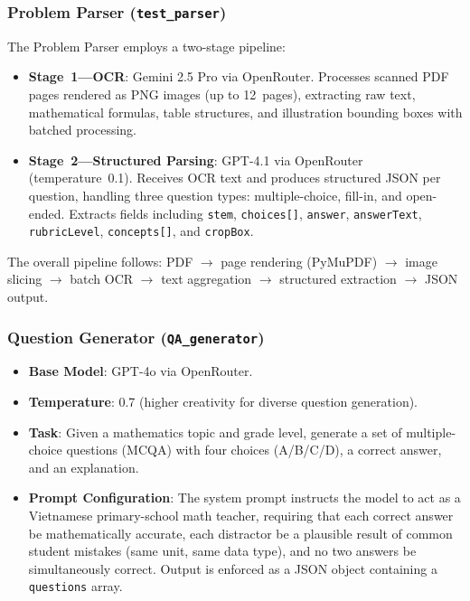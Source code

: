 \documentclass[12pt, a4paper]{article}
\begin{document}
\subsubsection{Problem Parser (\texttt{test\_parser})}
The Problem Parser employs a two-stage pipeline:
\begin{itemize}[nosep]
    \item \textbf{Stage~1---OCR}: Gemini 2.5 Pro via OpenRouter. Processes scanned PDF pages rendered as PNG images (up to 12~pages), extracting raw text, mathematical formulas, table structures, and illustration bounding boxes with batched processing.
    \item \textbf{Stage~2---Structured Parsing}: GPT-4.1 via OpenRouter (temperature~0.1). Receives OCR text and produces structured JSON per question, handling three question types: multiple-choice, fill-in, and open-ended. Extracts fields including \texttt{stem}, \texttt{choices[]}, \texttt{answer}, \texttt{answerText}, \texttt{rubricLevel}, \texttt{concepts[]}, and \texttt{cropBox}.
\end{itemize}
The overall pipeline follows: PDF $\rightarrow$ page rendering (PyMuPDF) $\rightarrow$ image slicing $\rightarrow$ batch OCR $\rightarrow$ text aggregation $\rightarrow$ structured extraction $\rightarrow$ JSON output.

\subsubsection{Question Generator (\texttt{QA\_generator})}
\begin{itemize}[nosep]
    \item \textbf{Base Model}: GPT-4o via OpenRouter.
    \item \textbf{Temperature}: 0.7 (higher creativity for diverse question generation).
    \item \textbf{Task}: Given a mathematics topic and grade level, generate a set of multiple-choice questions (MCQA) with four choices (A/B/C/D), a correct answer, and an explanation.
    \item \textbf{Prompt Configuration}: The system prompt instructs the model to act as a Vietnamese primary-school math teacher, requiring that each correct answer be mathematically accurate, each distractor be a plausible result of common student mistakes (same unit, same data type), and no two answers be simultaneously correct. Output is enforced as a JSON object containing a \texttt{questions} array.
\end{itemize}
\end{document}
